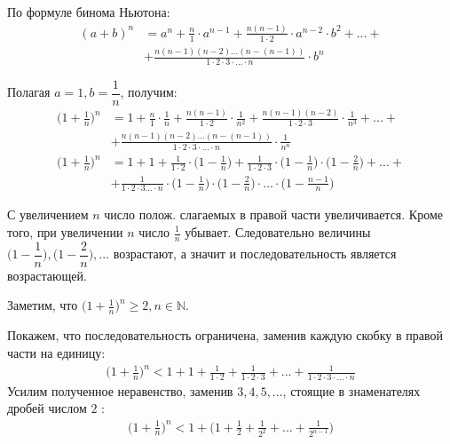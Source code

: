 \documentclass[a4paper,12pt]{extbook}
\theoremstyle{named}
\theoremstyle{named}
\begin{document}
По формуле бинома Ньютона:
\begin{align*}
    (a + b)^n & = a^n + \frac{n}{1} \cdot a^{n - 1} + \frac{n(n - 1)}{1 \cdot 2} \cdot a^{n - 2} \cdot b^2 + ... + \\
              & + \frac{n(n - 1)(n - 2)...(n - (n - 1))}{1 \cdot 2 \cdot 3 \cdot ... \cdot n} \cdot b^n
\end{align*}

Полагая \(a = 1, b = \dfrac{1}{n}\), получим:
\begin{align*}
    \Big(1 + \frac{1}{n}\Big)^n & = 1 + \frac{n}{1} \cdot \frac{1}{n} + \frac{n(n - 1)}{1 \cdot 2} \cdot \frac{1}{n^2} +
    \frac{n(n - 1)(n - 2)}{1 \cdot 2 \cdot 3} \cdot \frac{1}{n^3} + ... +                                                                                                                             \\
                                & +                            \frac{n(n - 1)(n - 2)...(n - (n - 1))}{1 \cdot 2 \cdot 3 \cdot ... \cdot n} \cdot \frac{1}{n^n}                                        \\
    \Big(1 + \frac{1}{n}\Big)^n & = 1 + 1 + \frac{1}{1 \cdot 2} \cdot \Big(1 - \frac{1}{n}\Big) + \frac{1}{1 \cdot 2 \cdot 3} \cdot \Big(1 - \frac{1}{n}\Big) \cdot \Big(1 - \frac{2}{n}\Big) + ... + \\
                                & + \frac{1}{1 \cdot 2 \cdot 3 ... \cdot n} \cdot \Big(1 - \frac{1}{n}\Big) \cdot \Big(1 - \frac{2}{n}\Big) \cdot ... \cdot \Big(1 - \frac{n - 1}{n}\Big)
\end{align*}

С увеличением \(n\) число полож. слагаемых в правой части увеличивается. Кроме того, при увеличении \(n\) число  \(\frac{1}{n}\) убывает. Следовательно величины \(\Big(1 - \dfrac{1}{n}\Big), \Big(1 - \dfrac{2}{n}\Big), ...\) возрастают, а значит и последовательность является возрастающей.

Заметим, что \(\Big(1 + \frac{1}{n}\Big)^n \geq 2, n \in \mathbb{N}\).

Покажем, что последовательность ограничена, заменив каждую скобку в правой части на единицу:
\begin{gather*}
    \Big(1 + \frac{1}{n}\Big)^n < 1 + 1 + \frac{1}{1 \cdot 2} + \frac{1}{1 \cdot 2 \cdot 3} + ... + \frac{1}{1 \cdot 2 \cdot 3 \cdot ... \cdot n}
\end{gather*}
Усилим полученное неравенство, заменив \(3, 4, 5, ...\), стоящие в знаменателях дробей числом  \(2\) :
\begin{gather*}
    \Big(1 + \frac{1}{n}\Big)^n < 1 + \Big(1 + \frac{1}{2} + \frac{1}{2^2} + ... + \frac{1}{2^{n - 1}}\Big)
\end{gather*}
\end{document}
